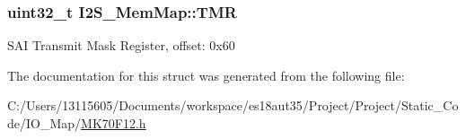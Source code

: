 \subsubsection[{T\+M\+R}]{\setlength{\rightskip}{0pt plus 5cm}uint32\+\_\+t I2\+S\+\_\+\+Mem\+Map\+::\+T\+M\+R}\label{struct_i2_s___mem_map_a52b2dd69044a5f8c990749c314664ae1}
S\+A\+I Transmit Mask Register, offset\+: 0x60 

The documentation for this struct was generated from the following file\+:\begin{DoxyCompactItemize}
\item 
C\+:/\+Users/13115605/\+Documents/workspace/es18aut35/\+Project/\+Project/\+Static\+\_\+\+Code/\+I\+O\+\_\+\+Map/\hyperlink{_m_k70_f12_8h}{M\+K70\+F12.\+h}\end{DoxyCompactItemize}
